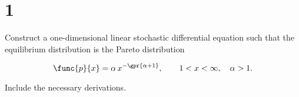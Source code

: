 \section{1}

Construct a one-dimensional linear stochastic differential equation such that the equilibrium distribution is the Pareto distribution

\begin{equation}
	\func{p}{x} = \alpha\,x^{-\gpr{\alpha + 1}},\qquad 1 < x < \infty,\quad \alpha > 1.
\end{equation}

Include the necessary derivations.


